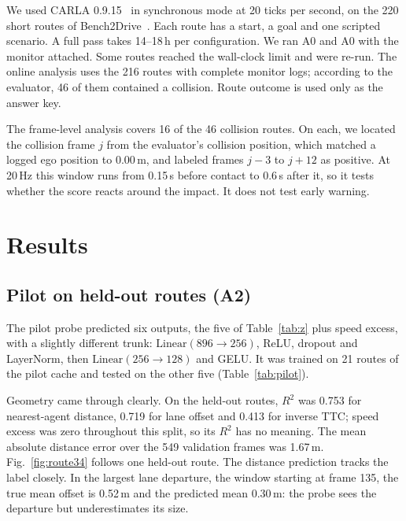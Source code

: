 \documentclass[conference]{IEEEtran}
\begin{document}
We used CARLA 0.9.15~\cite{dosovitskiy2017carla} in synchronous mode at 20 ticks per
second, on the 220 short routes of Bench2Drive~\cite{jia2024bench2drive}. Each route
has a start, a goal and one scripted scenario. A full pass takes 14--18\,h per
configuration. We ran A0 and A0 with the monitor attached. Some routes reached the
wall-clock limit and were re-run. The online analysis uses the 216 routes with
complete monitor logs; according to the evaluator, 46 of them contained a collision.
Route outcome is used only as the answer key.

The frame-level analysis covers 16 of the 46 collision routes. On each, we located
the collision frame $j$ from the evaluator's collision position, which matched a
logged ego position to 0.00\,m, and labeled frames $j-3$ to $j+12$ as positive. At
20\,Hz this window runs from 0.15\,s before contact to 0.6\,s after it, so it tests
whether the score reacts around the impact. It does not test early warning.

\section{Results}
\label{sec:results}

\subsection{Pilot on held-out routes (A2)}
\label{sec:res-pilot}

The pilot probe predicted six outputs, the five of Table~\ref{tab:z} plus speed
excess, with a slightly different trunk: $\mathrm{Linear}(896{\to}256)$, ReLU,
dropout and LayerNorm, then $\mathrm{Linear}(256{\to}128)$ and GELU. It was trained
on 21 routes of the pilot cache and tested on the other five (Table~\ref{tab:pilot}).

Geometry came through clearly. On the held-out routes, $R^2$ was 0.753 for
nearest-agent distance, 0.719 for lane offset and 0.413 for inverse TTC; speed excess
was zero throughout this split, so its $R^2$ has no meaning. The mean absolute
distance error over the 549 validation frames was 1.67\,m. Fig.~\ref{fig:route34}
follows one held-out route. The distance prediction tracks the label closely. In the
largest lane departure, the window starting at frame 135, the true mean offset is
0.52\,m and the predicted mean 0.30\,m: the probe sees the departure but
underestimates its size.
\end{document}

